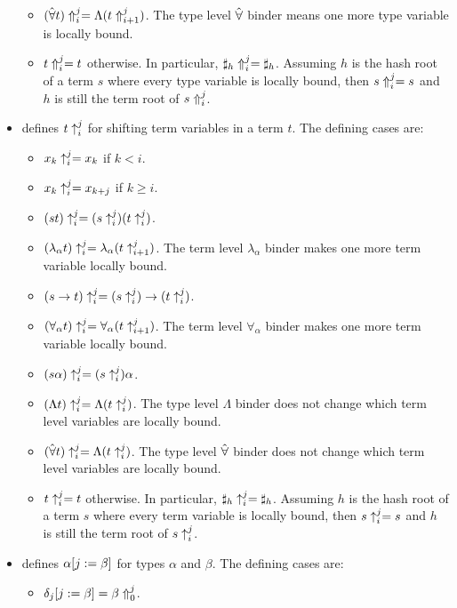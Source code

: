 \begin{itemize}
\begin{itemize}
\item $\dbtpsh{i}{j}{(\tforall t)} = \Lambda (\dbtpsh{i+1}{j}{t})$. The type level $\tforall$ binder means one more type variable is locally bound.
\item $\dbtpsh{i}{j}{t} = t$ otherwise. In particular, $\dbtpsh{i}{j}{\tmh{h}} = \tmh{h}$.
Assuming $h$ is the hash root of a term $s$ where every type variable is locally bound,
then $\dbtpsh{i}{j}{s} = s$
and $h$ is still the term root of $\dbtpsh{i}{j}{s}$.
\end{itemize}
\item {} defines $\dbsh{i}{j}{t}$ for shifting term variables in a term $t$.
The defining cases are:
\begin{itemize}
\item $\dbsh{i}{j}{x_k} = x_k$ if $k<i$.
\item $\dbsh{i}{j}{x_k} = x_{k+j}$ if $k\geq i$.
\item $\dbsh{i}{j}{(st)} = (\dbsh{i}{j}{s}) (\dbsh{i}{j}{t})$.
\item $\dbsh{i}{j}{(\lambda_\alpha t)} = \lambda_\alpha (\dbsh{i+1}{j}{t})$. The term level $\lambda_\alpha$ binder makes one more term variable locally bound.
\item $\dbsh{i}{j}{(s\to t)} = (\dbsh{i}{j}{s}) \to (\dbsh{i}{j}{t})$.
\item $\dbsh{i}{j}{(\forall_\alpha t)} = \forall_\alpha (\dbsh{i+1}{j}{t})$. The term level $\forall_\alpha$ binder makes one more term variable locally bound.
\item $\dbsh{i}{j}{(s\alpha)} = (\dbsh{i}{j}{s}) \alpha$.
\item $\dbsh{i}{j}{(\Lambda t)} = \Lambda (\dbsh{i}{j}{t})$. The type level $\Lambda$ binder does not change which term level variables are locally bound.
\item $\dbsh{i}{j}{(\tforall t)} = \Lambda (\dbsh{i}{j}{t})$. The type level $\tforall$ binder does not change which term level variables are locally bound.
\item $\dbsh{i}{j}{t} = t$ otherwise. In particular, $\dbsh{i}{j}{\tmh{h}} = \tmh{h}$.
Assuming $h$ is the hash root of a term $s$ where every term variable is locally bound,
then $\dbsh{i}{j}{s} = s$
and $h$ is still the term root of $\dbsh{i}{j}{s}$.
\end{itemize}
\item {} defines $\dbsub{j}{\beta}{\alpha}$ for types $\alpha$ and $\beta$.
The defining cases are:
\begin{itemize}
\item $\dbsub{j}{\beta}{\delta_j} = \dbtpsh{0}{j}{\beta}$.

\end{itemize}
\end{itemize}
